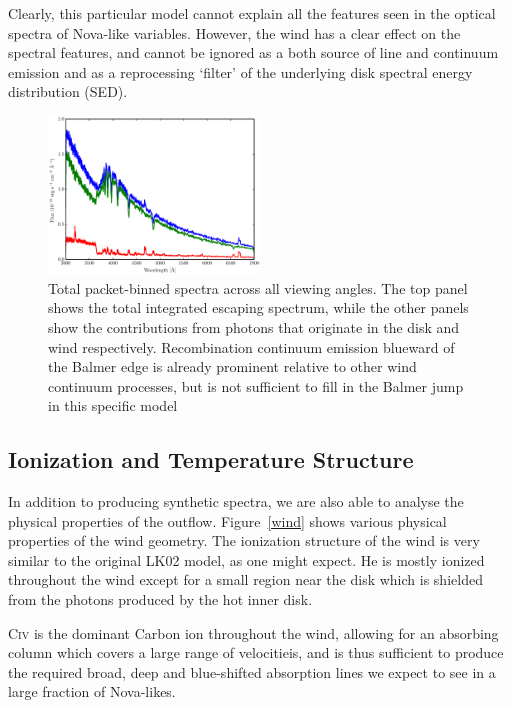 \documentclass[preprint, a4paper, 11pt]{aastex}
\begin{document}
Clearly, this particular model cannot explain all
the features seen in the optical spectra of Nova-like variables. However,
the wind has a clear effect on the spectral features, and cannot be ignored as 
a both source of line and continuum emission and as a reprocessing `filter'
of the underlying disk spectral energy distribution (SED).



\begin{figure} 
\includegraphics[width=0.5\textwidth]{figures/fig4.eps}
\caption{Total packet-binned spectra across all viewing angles. The top panel shows the total 
integrated escaping spectrum, while the other panels show the contributions from photons that originate
in the disk and wind respectively. Recombination continuum emission blueward of the Balmer 
edge is already prominent relative to other wind continuum processes, but is not sufficient
to fill in the Balmer jump in this specific model}
\label{cont}
\end{figure} 

\subsection{Ionization and Temperature Structure}

In addition to producing synthetic spectra, we are also able to 
analyse the physical properties of the outflow.
Figure~\ref{wind} shows various physical properties
of the wind geometry. The ionization structure of the wind
is very similar to the original LK02 model, as one might expect.
He is mostly ionized throughout the wind except for a small region near
the disk which is shielded from the photons produced by the hot inner disk.

C\textsc{iv} is the dominant Carbon ion throughout the wind, allowing
for an absorbing column which covers a large range of velocitieis, and is thus
sufficient to produce the required broad, deep and blue-shifted absorption lines
we expect to see in a large fraction of Nova-likes.
\end{document}
